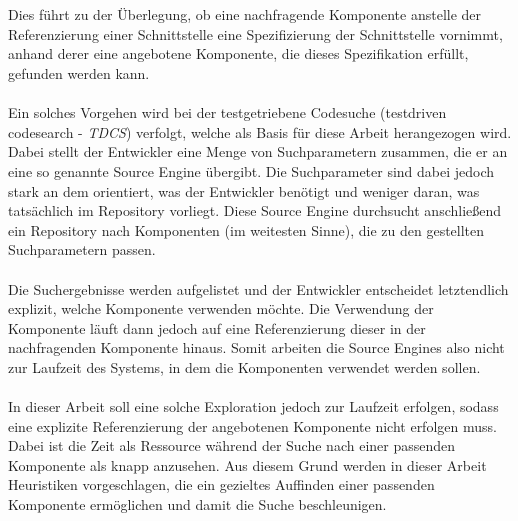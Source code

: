 \\\\
Dies führt zu der Überlegung, ob eine nachfragende Komponente anstelle der Referenzierung einer Schnittstelle eine Spezifizierung der Schnittstelle vornimmt, anhand derer eine angebotene Komponente, die dieses Spezifikation erfüllt, gefunden werden kann.
\\\\
Ein solches Vorgehen wird bei der testgetriebene Codesuche (testdriven codesearch - \emph{TDCS}) verfolgt, welche als Basis für diese Arbeit herangezogen wird. Dabei stellt der Entwickler eine Menge von Suchparametern zusammen, die er an eine so genannte Source Engine übergibt. Die Suchparameter sind dabei jedoch stark an dem orientiert, was der Entwickler benötigt und weniger daran, was tatsächlich im Repository vorliegt. Diese Source Engine durchsucht anschließend ein Repository nach Komponenten (im weitesten Sinne), die zu den gestellten Suchparametern passen. 
\\\\
Die Suchergebnisse werden aufgelistet und der Entwickler entscheidet letztendlich explizit, welche Komponente verwenden möchte. Die Verwendung der Komponente läuft dann jedoch auf eine Referenzierung dieser in der nachfragenden Komponente hinaus. Somit arbeiten die Source Engines also nicht zur Laufzeit des Systems, in dem die Komponenten verwendet werden sollen.
\\\\
In dieser Arbeit soll eine solche Exploration jedoch zur Laufzeit erfolgen, sodass eine explizite Referenzierung der angebotenen Komponente nicht erfolgen muss. Dabei ist die Zeit als Ressource während der Suche nach einer passenden Komponente als knapp anzusehen. Aus diesem Grund werden in dieser Arbeit Heuristiken vorgeschlagen, die ein gezieltes Auffinden einer passenden Komponente ermöglichen und damit die Suche beschleunigen.

